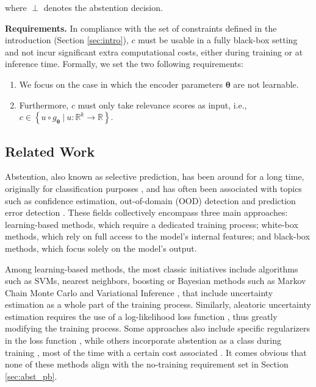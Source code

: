 \noindent where $\perp$ denotes the abstention decision.

\noindent \textbf{Requirements.} In compliance with the set of constraints defined in the introduction (Section \ref{sec:intro}), $c$ must be usable in a fully black-box setting and not incur significant extra computational costs, either during training or at inference time. Formally, we set the two following requirements:

\begin{enumerate}[noitemsep, topsep=-1mm,  leftmargin=8mm]
\item We focus on the case in which the encoder parameters $\bm{\theta}$ are not learnable. 
\item Furthermore, $c$ must only take relevance scores as input, i.e., $c \in \left \{ u \circ g_{\bm{\theta}} \ | \ u : \mathbb{R}^k \rightarrow \mathbb{R} \right \}$.
\end{enumerate}


\subsection{Related Work}

Abstention, also known as selective prediction, has been around for a long time, originally for classification purposes , and has often been associated with topics such as confidence estimation, out-of-domain (OOD) detection  and prediction error detection . These fields collectively encompass three main approaches: learning-based methods, which require a dedicated training process; white-box methods, which rely on full access to the model's internal features; and black-box methods, which focus solely on the model's output.

Among learning-based methods, the most classic initiatives include algorithms such as SVMs, nearest neighbors, boosting  or Bayesian methods  such as Markov Chain Monte Carlo  and Variational Inference , that include uncertainty estimation as a whole part of the training process. Similarly, aleatoric uncertainty estimation requires the use of a log-likelihood loss function , thus greatly modifying the training process. Some approaches also include specific regularizers in the loss function , while others incorporate abstention as a class during training , most of the time with a certain cost associated \cite{JMLR:v11:el-yaniv10a, cortes2016boosting, pmlr-v97-geifman19a}. It comes obvious that none of these methods align with the no-training requirement set in Section \ref{sec:abst_pb}.

